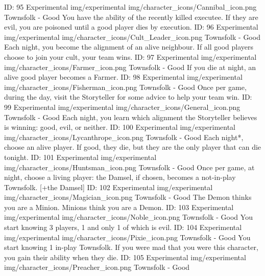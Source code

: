 	{ID: 95}
	{Experimental}
	{img/experimental}
	{img/character_icons/Cannibal_icon.png}
	{\color{goodcolor}Townsfolk - Good}
	{You have the ability of the recently killed executee. If they are evil, you are poisoned until a good player dies by execution.}        
	{ID: 96}
	{Experimental}
	{img/experimental}
	{img/character_icons/Cult_Leader_icon.png}
	{\color{goodcolor}Townsfolk - Good}
	{Each night, you become the alignment of an alive neighbour. If all good players choose to join your cult, your team wins.}        
	{ID: 97}
	{Experimental}
	{img/experimental}
	{img/character_icons/Farmer_icon.png}
	{\color{goodcolor}Townsfolk - Good}
	{If you die at night, an alive good player becomes a Farmer.}        
	{ID: 98}
	{Experimental}
	{img/experimental}
	{img/character_icons/Fisherman_icon.png}
	{\color{goodcolor}Townsfolk - Good}
	{Once per game, during the day, visit the Storyteller for some advice to help your team win.}        
	{ID: 99}
	{Experimental}
	{img/experimental}
	{img/character_icons/General_icon.png}
	{\color{goodcolor}Townsfolk - Good}
	{Each night, you learn which alignment the Storyteller believes is winning: good, evil, or neither.}        
	{ID: 100}
	{Experimental}
	{img/experimental}
	{img/character_icons/Lycanthrope_icon.png}
	{\color{goodcolor}Townsfolk - Good}
	{Each night*, choose an alive player. If good, they die, but they are the only player that can die tonight.}        
	{ID: 101}
	{Experimental}
	{img/experimental}
	{img/character_icons/Huntsman_icon.png}
	{\color{goodcolor}Townsfolk - Good}
	{Once per game, at night, choose a living player: the Damsel, if chosen, becomes a not-in-play Townsfolk. [+the Damsel]}        
	{ID: 102}
	{Experimental}
	{img/experimental}
	{img/character_icons/Magician_icon.png}
	{\color{goodcolor}Townsfolk - Good}
	{The Demon thinks you are a Minion. Minions think you are a Demon.}        
	{ID: 103}
	{Experimental}
	{img/experimental}
	{img/character_icons/Noble_icon.png}
	{\color{goodcolor}Townsfolk - Good}
	{You start knowing 3 players, 1 and only 1 of which is evil.}        
	{ID: 104}
	{Experimental}
	{img/experimental}
	{img/character_icons/Pixie_icon.png}
	{\color{goodcolor}Townsfolk - Good}
	{You start knowing 1 in-play Townsfolk. If you were mad that you were this character, you gain their ability when they die.}        
	{ID: 105}
	{Experimental}
	{img/experimental}
	{img/character_icons/Preacher_icon.png}
	{\color{goodcolor}Townsfolk - Good}
